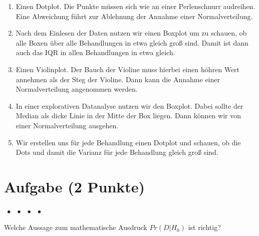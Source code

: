 \documentclass[a4paper, 9pt]{scrartcl}\usepackage[]{graphicx}\usepackage[]{xcolor}
\begin{document}
{\begin{enumerate}
\item [\textbf{A} \msquare] Einen Dotplot. Die Punkte müssen sich wie an einer Perlenschnurr audreihen. Eine Abweichung führt zur Ablehnung der Annahme einer Normalverteilung.
\item [\textbf{B} \msquare] Nach dem Einlesen der Daten nutzen wir einen Boxplot um zu schauen, ob alle Boxen über alle Behandlungen in etwa gleich groß sind. Damit ist dann auch das IQR in allen Behandlungen in etwa gleich.
\item [\textbf{C} \msquare] Einen Violinplot. Der Bauch der Violine muss hierbei einen höhren Wert annehmen als der Steg der Violine. Dann kann die Annahme einer Normalverteilung angenommen werden.
\item [\textbf{D} \msquare] In einer explorativen Datanalyse nutzen wir den Boxplot. Dabei sollte der Median als dicke Linie in der Mitte der Box liegen. Dann können wir von einer Normalverteilung ausgehen.
\item [\textbf{E} \msquare] Wir erstellen uns für jede Behandlung einen Dotplot und schauen, ob die Dots und damit die Varianz für jede Behandlung gleich groß sind.
\end{enumerate} 

\section{Aufgabe \hfill (2 Punkte)}

\ifcollection
\begin{flushright}
\tiny\vspace{-2Ex}
\textbf{\examinhaltstart}
\exammodulemathstat $\;\bullet$
\exammodulestat $\;\bullet$
\exammodulestatbbv $\;\bullet$
\exammodulestatversuch $\;\bullet$
\exammodulebiostat
\vspace{-1Ex}
\end{flushright}
\fi




Welche Aussage zum mathematische Ausdruck $Pr(D|H_0)$ ist richtig?



}
\end{document}
